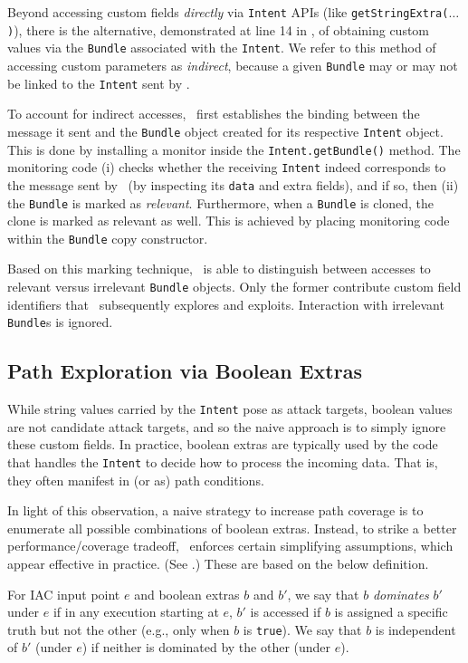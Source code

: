 Beyond accessing custom fields \emph{directly} via {\tt Intent} APIs (like {\tt getStringExtra($\ldots$)}), there is the alternative, demonstrated at line 14 in , of obtaining custom values via the {\tt Bundle} associated with the {\tt Intent}. We refer to this method of accessing custom parameters as \emph{indirect}, because a given {\tt Bundle} may or may not be linked to the {\tt Intent} sent by \Tool.

To account for indirect accesses, \Tool\ first establishes the binding between the message it sent and the {\tt Bundle} object created for its respective {\tt Intent} object. This is done by installing a monitor inside the {\tt Intent.getBundle()} method. The monitoring code (i) checks whether the receiving {\tt Intent} indeed corresponds to the message sent by \Tool\ (by inspecting its {\tt data} and extra fields), and if so, then (ii) the {\tt Bundle} is marked as \emph{relevant}. Furthermore, when a {\tt Bundle} is cloned, the clone is marked as relevant as well. This is achieved by placing monitoring code within the {\tt Bundle} copy constructor.

Based on this marking technique, \Tool\ is able to distinguish between accesses to relevant versus irrelevant {\tt Bundle} objects. Only the former contribute custom field identifiers that \Tool\ subsequently explores and exploits. Interaction with irrelevant {\tt Bundle}s is ignored.

\subsection{Path Exploration via Boolean Extras}

While string values carried by the {\tt Intent} pose as attack targets, boolean values are not candidate attack targets, and so the naive approach is to simply ignore these custom fields. In practice, boolean extras are typically used by the code that handles the {\tt Intent} to decide how to process the incoming data. That is, they often manifest in (or as) path conditions.

In light of this observation, a naive strategy to increase path coverage is to enumerate all possible combinations of boolean extras. Instead, to strike a better performance/coverage tradeoff, \Tool\ enforces certain simplifying assumptions, which appear effective in practice. (See .) These are based on the below definition.

\begin{definition} For IAC input point $e$ and boolean extras $b$ and $b'$, we say that $b$ \emph{dominates} $b'$ under $e$ if in any execution starting at $e$, $b'$ is accessed if $b$ is assigned a specific truth but not the other (e.g., only when $b$ is {\tt true}). We say that $b$ is independent of $b'$ (under $e$) if neither is dominated by the other (under $e$).
\end{definition}

